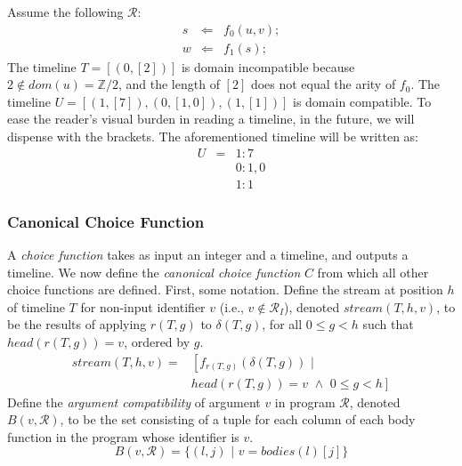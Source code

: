 \begin{example}
Assume the following $\mathcal{R}$:
\begin{eqnarray*}
  s &\Leftarrow& f_0(u, v); \\
  w &\Leftarrow& f_1(s);
\end{eqnarray*}
The timeline $T = [(0, [2])]$ is domain incompatible because $2 \not\in dom(u) = \mathbb{Z}/2$, and the length of $[2]$ does not equal the arity of $f_0$.  The timeline $U = [(1,[7]), (0,[1,0]), (1,[1])]$ is domain compatible.  To ease the reader's visual burden in reading a timeline, in the future, we will dispense with the brackets.  The aforementioned timeline will be written as:
\begin{eqnarray*}
U & = & 1 : 7 \\
 		&		& 0 : 1, 0 \\
		&		& 1 : 1
\end{eqnarray*}

\end{example}

\subsubsection{Canonical Choice Function}

A {\em choice function} takes as input an integer and a timeline, and outputs a timeline.  We now define the {\em canonical choice function} $C$ from which all other choice functions are defined.  First, some notation.  
Define the stream at position $h$ of timeline $T$ for non-input identifier $v$ (i.e., $v \not\in \mathcal{R}_I$), denoted $stream(T,h,v)$, to be the results of applying $r(T,g)$ to $\delta(T,g)$, for all $0 \leq g < h$ such that $head(r(T,g)) = v$, ordered by $g$.
\begin{equation*}
\begin{split}
stream(T,h,v) = & \left[ f_{r(T,g)}(\delta(T,g)) \,\, | \right. \\
& \left. head(r(T,g)) = v \,\, \land \,\, 0 \leq g < h \right]
\end{split}
\end{equation*}
Define the {\em argument compatibility} of argument $v$ in program $\mathcal{R}$, denoted $B(v,\mathcal{R})$, to be the set consisting of a tuple for each column of each body function in the program whose identifier is $v$.
$$
B(v,\mathcal{R}) = \{(l,j) \,\, | \,\, v = bodies(l)[j]\}
$$

